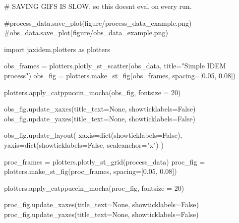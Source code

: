 \documentclass[
]{report}
\newenvironment{Shaded}{\begin{snugshade}}{\end{snugshade}}
\newcommand{\BuiltInTok}[1]{\textcolor[rgb]{0.00,0.23,0.31}{#1}}
\newcommand{\CommentTok}[1]{\textcolor[rgb]{0.37,0.37,0.37}{#1}}
\newcommand{\DecValTok}[1]{\textcolor[rgb]{0.68,0.00,0.00}{#1}}
\newcommand{\FloatTok}[1]{\textcolor[rgb]{0.68,0.00,0.00}{#1}}
\newcommand{\ImportTok}[1]{\textcolor[rgb]{0.00,0.46,0.62}{#1}}
\newcommand{\NormalTok}[1]{\textcolor[rgb]{0.00,0.23,0.31}{#1}}
\newcommand{\OperatorTok}[1]{\textcolor[rgb]{0.37,0.37,0.37}{#1}}
\newcommand{\StringTok}[1]{\textcolor[rgb]{0.13,0.47,0.30}{#1}}
\newcommand{\VariableTok}[1]{\textcolor[rgb]{0.07,0.07,0.07}{#1}}
\theoremstyle{plain}
\theoremstyle{plain}
\theoremstyle{remark}
\begin{document}
\begin{Shaded}
\begin{Highlighting}[]
\CommentTok{\# SAVING GIFS IS SLOW, so this doesn\textquotesingle{}t eval on every run.}

\CommentTok{\#process\_data.save\_plot(\textquotesingle{}figure/process\_data\_example.png\textquotesingle{})}
\CommentTok{\#obs\_data.save\_plot(\textquotesingle{}figure/obs\_data\_example.png\textquotesingle{})}

\ImportTok{import}\NormalTok{ jaxidem.plotters }\ImportTok{as}\NormalTok{ plotters}

\NormalTok{obs\_frames }\OperatorTok{=}\NormalTok{ plotters.plotly\_st\_scatter(obs\_data, title}\OperatorTok{=}\StringTok{"Simple IDEM process"}\NormalTok{)}
\NormalTok{obs\_fig }\OperatorTok{=}\NormalTok{ plotters.make\_st\_fig(obs\_frames, spacing}\OperatorTok{=}\NormalTok{[}\FloatTok{0.05}\NormalTok{, }\FloatTok{0.08}\NormalTok{])}

\NormalTok{plotters.apply\_catppuccin\_mocha(obs\_fig, fontsize }\OperatorTok{=} \DecValTok{20}\NormalTok{)}

\NormalTok{obs\_fig.update\_xaxes(title\_text}\OperatorTok{=}\VariableTok{None}\NormalTok{, showticklabels}\OperatorTok{=}\VariableTok{False}\NormalTok{)}
\NormalTok{obs\_fig.update\_yaxes(title\_text}\OperatorTok{=}\VariableTok{None}\NormalTok{, showticklabels}\OperatorTok{=}\VariableTok{False}\NormalTok{)}

\NormalTok{obs\_fig.update\_layout(}
\NormalTok{    xaxis}\OperatorTok{=}\BuiltInTok{dict}\NormalTok{(showticklabels}\OperatorTok{=}\VariableTok{False}\NormalTok{),}
\NormalTok{    yaxis}\OperatorTok{=}\BuiltInTok{dict}\NormalTok{(showticklabels}\OperatorTok{=}\VariableTok{False}\NormalTok{, scaleanchor}\OperatorTok{=}\StringTok{"x"}\NormalTok{)}
\NormalTok{)}

\NormalTok{proc\_frames }\OperatorTok{=}\NormalTok{ plotters.plotly\_st\_grid(process\_data)}
\NormalTok{proc\_fig }\OperatorTok{=}\NormalTok{ plotters.make\_st\_fig(proc\_frames, spacing}\OperatorTok{=}\NormalTok{[}\FloatTok{0.05}\NormalTok{, }\FloatTok{0.08}\NormalTok{])}

\NormalTok{plotters.apply\_catppuccin\_mocha(proc\_fig, fontsize }\OperatorTok{=} \DecValTok{20}\NormalTok{)}

\NormalTok{proc\_fig.update\_xaxes(title\_text}\OperatorTok{=}\VariableTok{None}\NormalTok{, showticklabels}\OperatorTok{=}\VariableTok{False}\NormalTok{)}
\NormalTok{proc\_fig.update\_yaxes(title\_text}\OperatorTok{=}\VariableTok{None}\NormalTok{, showticklabels}\OperatorTok{=}\VariableTok{False}\NormalTok{)}


\end{Highlighting}
\end{Shaded}
\end{document}
